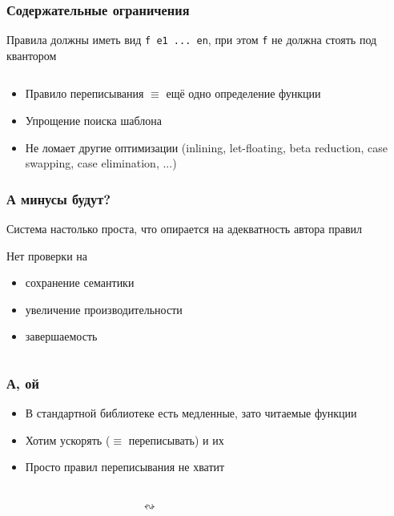 \documentclass[
    aspectratio=169,
]{beamer}
\begin{document}
\begin{frame}
    \frametitle{Содержательные ограничения}

    Правила должны иметь вид \texttt{f e1 ... en}, при этом \texttt{f} не должна стоять под квантором

    \inputminted[firstline=112, lastline=115]{text}{Code.hs}

    \begin{itemize}
        \item Правило переписывания $\equiv$ ещё одно определение функции
        \item Упрощение поиска шаблона
        \item Не ломает другие оптимизации (inlining, let-floating, beta reduction, case swapping, case elimination, ...)
    \end{itemize}
\end{frame}

\begin{frame}[fragile]
    \frametitle{А минусы будут?}

    Система настолько проста, что опирается на адекватность автора правил

    Нет проверки на
    \begin{itemize}
        \item сохранение семантики
        \item увеличение производительности
        \item завершаемость
              \inputminted[firstline=22, lastline=23]{text}{Code.hs}
    \end{itemize}

\end{frame}

\begin{frame}[fragile]
    \frametitle{А, ой}

    \begin{itemize}
        \item В стандартной библиотеке есть медленные, зато читаемые функции
        \item Хотим ускорять ($\equiv$ переписывать) и их
        \item Просто правил переписывания не хватит
    \end{itemize}


    \begin{columns}
        \begin{column}{0.45\textwidth}
            \inputminted[firstline=25, lastline=26]{haskell}{Code.hs}
        \end{column}
        \begin{column}{0.05\textwidth}
            $\leftrightsquigarrow$
        \end{column}
        \begin{column}{0.45\textwidth}
            \inputminted[firstline=28, lastline=31]{haskell}{Code.hs}
        \end{column}
    \end{columns}
\end{frame}
\end{document}
